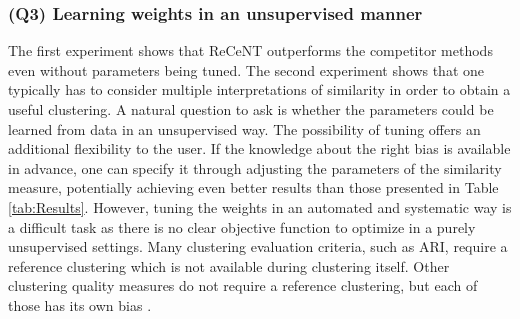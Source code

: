 








\subsubsection{\textbf{(Q3) Learning weights in an unsupervised manner}}

The first experiment shows that ReCeNT outperforms the competitor methods even without parameters being tuned.
The second experiment shows that one typically has to consider multiple interpretations of similarity in order to obtain a useful clustering.
A natural question to ask is whether the  parameters could be learned from data in an unsupervised way.
The possibility of tuning offers an additional flexibility to the user.
If the knowledge about the right bias is available in advance, one can specify it through adjusting the parameters of the similarity measure, potentially achieving even better results than those presented in Table \ref{tab:Results}.
However, tuning the weights in an automated and systematic way is a difficult task as there is no clear objective function to optimize in a purely unsupervised settings.
Many clustering evaluation criteria, such as ARI, require a reference clustering which is not available during clustering itself.  Other clustering quality measures do not require a reference clustering, but each of those has its own bias \cite{VanCraenendonck15}.


